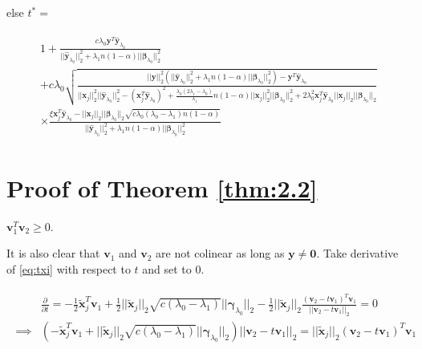 else $t^*=$

\begin{gather}
    \begin{aligned}
        1+\frac{c\lambda_0\boldsymbol y^T\hat{\boldsymbol y}_{\lambda_0}}{||\hat{\boldsymbol y}_{\lambda_0}||_2^2+\lambda_1n(1-\alpha)||\boldsymbol\beta_{\lambda_0}||_2^2}\\
        +c\lambda_0\sqrt{\frac{||\boldsymbol y||_2^2\left(||\hat{\boldsymbol y}_{\lambda_0}||_2^2+\lambda_1n(1-\alpha)||\boldsymbol\beta_{\lambda_0}||_2^2\right)-\boldsymbol y^T\hat{\boldsymbol y}_{\lambda_0}}{||\boldsymbol x_j||_2^2||\hat{\boldsymbol y}_{\lambda_0}||_2^2-(\boldsymbol x_j^T\hat{\boldsymbol y}_{\lambda_0})^2+\frac{\lambda_0(2\lambda_1-\lambda_0)}{\lambda_1}n(1-\alpha)||\boldsymbol x_j||_2^2||\boldsymbol\beta_{\lambda_0}||_2^2+2\lambda_0^2\boldsymbol x_j^T\hat{\boldsymbol y}_{\lambda_0}||\boldsymbol x_j||_2||\boldsymbol\beta_{\lambda_0}||_2}}\\
        \times \frac{\xi \boldsymbol x_j^T\hat{\boldsymbol y}_{\lambda_0}-||\boldsymbol x_j||_2||\boldsymbol\beta_{\lambda_0}||_2\sqrt{c\lambda_0(\lambda_0-\lambda_1)n(1-\alpha)}}{||\hat{\boldsymbol y}_{\lambda_0}||_2^2+\lambda_1n(1-\alpha)||\boldsymbol\beta_{\lambda_0}||_2^2}
    \end{aligned}
\end{gather}

\section{Proof of Theorem \ref{thm:2.2}}

\begin{lemma}
    \label{lem:2.4.1}
    $\boldsymbol v_1^T \boldsymbol v_2\geq 0$.
\end{lemma}

It is also clear that $\boldsymbol v_1$ and $\boldsymbol v_2$ are not colinear as long as $\boldsymbol y\neq \boldsymbol0$. Take derivative of \eqref{eq:txi} with respect to $t$ and set to 0.

\begin{gather}
    \label{eq:2.4.1}
    \begin{aligned}
        &\frac{\partial}{\partial t}=-\frac{1}{2}\tilde{\boldsymbol x}_j^T\boldsymbol v_1+\frac{1}{2}||\tilde{\boldsymbol x}_j||_2\sqrt{c(\lambda_0-\lambda_1)}||\boldsymbol\gamma_{\lambda_0}||_2-\frac{1}{2}||\tilde{\boldsymbol x}_j||_2\frac{(\boldsymbol v_2-t\boldsymbol v_1)^T\boldsymbol v_1}{||\boldsymbol v_2-t\boldsymbol v_1||_2}=0\\
        \implies & \left(-\tilde{\boldsymbol x}_j^T\boldsymbol v_1+||\tilde{\boldsymbol x}_j||_2\sqrt{c(\lambda_0-\lambda_1)}||\boldsymbol\gamma_{\lambda_0}||_2\right)||\boldsymbol v_2-t\boldsymbol v_1||_2=||\tilde{\boldsymbol x}_j||_2(\boldsymbol v_2-t\boldsymbol v_1)^T\boldsymbol v_1
    \end{aligned}
\end{gather}

